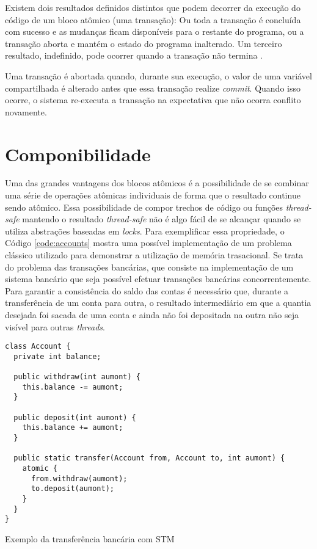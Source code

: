 Existem dois resultados definidos distintos que podem decorrer da execução do código de um bloco atômico (uma transação): Ou toda a transação é concluída com sucesso e as mudanças ficam disponíveis para o restante do programa, ou a transação aborta e mantém o estado do programa inalterado. Um terceiro resultado, indefinido, pode ocorrer quando a transação não termina \cite{helinefficiency}.

Uma transação é abortada quando, durante sua execução, o valor de uma variável compartilhada é alterado antes que essa transação realize \emph{commit}. Quando isso ocorre, o sistema re-executa a transação na expectativa que não ocorra conflito novamente.


\section{Componibilidade}

Uma das grandes vantagens dos blocos atômicos é a possibilidade de se combinar uma série de operações atômicas individuais de forma que o resultado continue sendo atômico. Essa possibilidade de compor trechos de código ou funções \emph{thread-safe} mantendo o resultado \emph{thread-safe} não é algo fácil de se alcançar quando se utiliza abstrações baseadas em \emph{locks}. Para exemplificar essa propriedade, o Código \ref{code:accounts} mostra uma possível implementação de um problema clássico utilizado para demonstrar a utilização de memória trasacional. Se trata do problema das transações bancárias, que consiste na implementação de um sistema bancário que seja possível efetuar transações bancárias concorrentemente. Para garantir a consistência do saldo das contas é necessário que, durante a transferência de um conta para outra, o resultado intermediário em que a quantia desejada foi sacada de uma conta e ainda não foi depositada na outra não seja visível para outras \emph{threads}.

\begin{listing}
  \begin{verbatim}
class Account {
  private int balance;
  
  public withdraw(int aumont) {
    this.balance -= aumont;
  }

  public deposit(int aumont) {
    this.balance += aumont;
  }

  public static transfer(Account from, Account to, int aumont) {
    atomic {
      from.withdraw(aumont);
      to.deposit(aumont);
    }
  }
}
  \end{verbatim}
  \caption{Exemplo da transferência bancária com STM}
  \label{code:accounts}
\end{listing}

